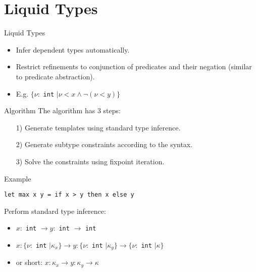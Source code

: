 \documentclass[pdf]{beamer}
\begin{document}
\section{Liquid Types}
\begin{frame}{Liquid Types}
  \begin{itemize}
    \item Infer dependent types automatically.
    \item Restrict refinements to conjunction of predicates and their negation (similar to predicate abstraction).
    \item E.g. $\{\nu:$ \lstinline{int} $\mid \nu < x \land \neg(\nu < y)\}$
  \end{itemize}
\end{frame}

\begin{frame}{Algorithm}
  The algorithm has 3 steps:
  \begin{itemize}
    \item[1)] Generate templates using standard type inference.
    \item[2)] Generate subtype constraints according to the syntax.
    \item[3)] Solve the constraints using fixpoint iteration.
  \end{itemize}
\end{frame}

\begin{frame}[fragile]{Example}
  \begin{verbatim}
let max x y = if x > y then x else y
  \end{verbatim}
  Perform standard type inference:
  \begin{itemize}
    \item $x:$ \lstinline{int} $\rightarrow y:$ \lstinline{int} $\rightarrow$ \lstinline{int}
    \item $x: \{\nu:$ \lstinline{int} $\mid \kappa_x\} \rightarrow y: \{\nu:$ \lstinline{int} $\mid \kappa_y\} \rightarrow \{\nu:$ \lstinline{int} $\mid \kappa\}$
    \item or short: $x: \kappa_x \rightarrow y: \kappa_y \rightarrow \kappa$
  \end{itemize}
\end{frame}
\end{document}
